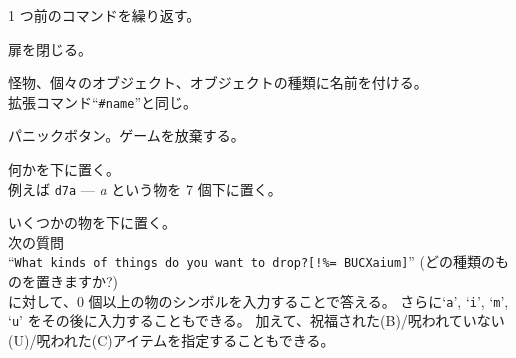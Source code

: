 \item[\tb{\^{}A}]
1 つ前のコマンドを繰り返す。
\item[\tb{c}]
扉を閉じる。
\item[\tb{C}]
怪物、個々のオブジェクト、オブジェクトの種類に名前を付ける。\\
拡張コマンド``{\tt \#name}''と同じ。
\item[\tb{\^{}C}]
パニックボタン。ゲームを放棄する。
\item[\tb{d}]
何かを下に置く。\\
例えば {\tt d7a} --- {\it a} という物を 7 個下に置く。
\item[\tb{D}]
いくつかの物を下に置く。\\
次の質問\\
``{\tt What kinds of things do you want to drop?[!\%= BUCXaium]}''
(どの種類のものを置きますか?)\\
に対して、0 個以上の物のシンボルを入力することで答える。
さらに`{\tt a}', `{\tt i}', `{\tt m}', `{\tt u}' をその後に入力することもできる。
加えて、祝福された(B)/呪われていない(U)/呪われた(C)アイテムを指定することもできる。\\
